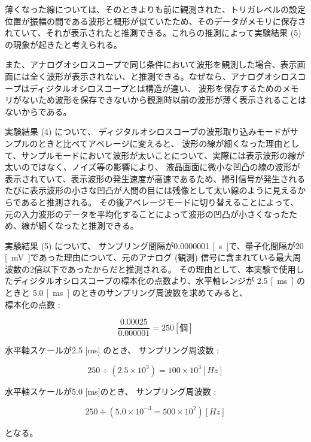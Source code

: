 薄くなった線については、そのときよりも前に観測された、トリガレベルの設定位置が振幅の間である波形と概形が似ていたため、そのデータがメモリに保存されていて、それが表示されたと推測できる。これらの推測によって実験結果 (5) の現象が起きたと考えられる。
\par
また、アナログオシロスコープで同じ条件において波形を観測した場合、表示画面には全く波形が表示されない、と推測できる。なぜなら、アナログオシロスコープはディジタルオシロスコープとは構造が違い、
波形を保存するためのメモリがないため波形を保存できないから観測時以前の波形が薄く表示されることはないからである。
\par
実験結果 (4) について、
ディジタルオシロスコープの波形取り込みモードがサンプルのときと比べてアベレージに変えると、
波形の線が細くなった理由として、サンプルモードにおいて波形が太いことについて、実際には表示波形の線が太いのではなく、ノイズ等の影響により、
液晶画面に微小な凹凸の線の波形が表示されていて、表示波形の発生速度が高速であるため、掃引信号が発生されるたびに表示波形の小さな凹凸が人間の目には残像として太い線のように見えるからであると推測される。
その後アベレージモードに切り替えることによって、元の入力波形のデータを平均化することによって波形の凹凸が小さくなったため、線が細くなったと推測できる。
\par
実験結果 (5) について、
サンプリング間隔が0.0000001 \si{[s]}で、量子化間隔が20 \si{[\milli V]}であった理由について、元のアナログ (観測) 信号に含まれている最大周波数の2倍以下であったからだと推測される。
その理由として、本実験で使用したディジタルオシロスコープの標本化の点数より、水平軸レンジが 2.5 \si{[\milli s]} のときと 5.0 \si{[\milli s]} のときのサンプリング周波数を求めてみると、
\\標本化の点数 :
\begin{screen}
  \begin{equation}
    \frac{0.00025}{0.000001} = 250 \label{eq22} [個]
  \end{equation}
\end{screen}

水平軸スケールが2.5 [ms] のとき、
サンプリング周波数 :
\begin{screen}
  \begin{equation}
    250\div\left(2.5\times 10^3\right) = 100\times10^3 \si{[Hz]} \label{eq23}
  \end{equation}
\end{screen}

水平軸スケールが5.0 [ms]のとき、
サンプリング周波数 :
\begin{screen}
  \begin{equation}
    250\div\left(5.0\times10^{-3} = 500\times 10^2\right) \si{[Hz]} \label{eq24}
  \end{equation}
\end{screen}
となる。

